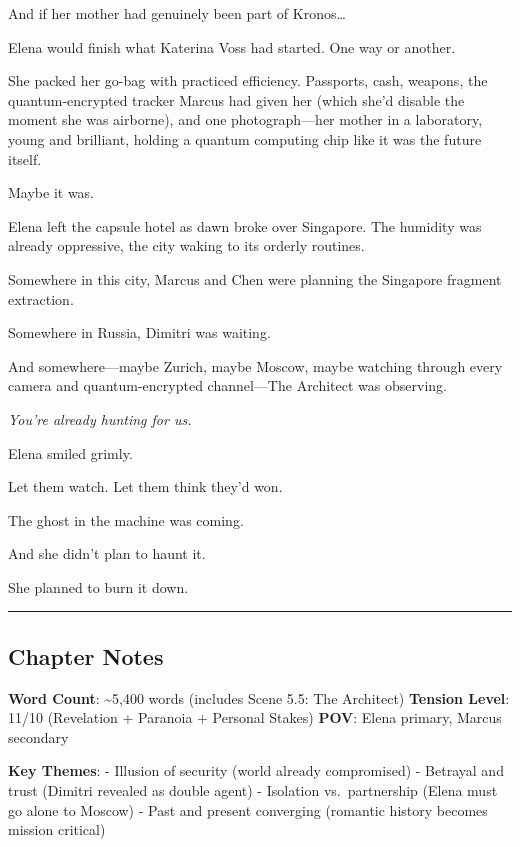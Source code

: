 And if her mother had genuinely been part of Kronos\ldots{}

Elena would finish what Katerina Voss had started. One way or another.

She packed her go-bag with practiced efficiency. Passports, cash, weapons, the quantum-encrypted tracker Marcus had given her (which she'd disable the moment she was airborne), and one photograph---her mother in a laboratory, young and brilliant, holding a quantum computing chip like it was the future itself.

Maybe it was.

Elena left the capsule hotel as dawn broke over Singapore. The humidity was already oppressive, the city waking to its orderly routines.

Somewhere in this city, Marcus and Chen were planning the Singapore fragment extraction.

Somewhere in Russia, Dimitri was waiting.

And somewhere---maybe Zurich, maybe Moscow, maybe watching through every camera and quantum-encrypted channel---The Architect was observing.

\emph{You're already hunting for us.}

Elena smiled grimly.

Let them watch. Let them think they'd won.

The ghost in the machine was coming.

And she didn't plan to haunt it.

She planned to burn it down.

\begin{center}\rule{0.5\linewidth}{0.5pt}\end{center}

\hypertarget{chapter-notes}{%
\subsection{Chapter Notes}\label{chapter-notes}}

\textbf{Word Count}: \textasciitilde5,400 words (includes Scene 5.5: The Architect) \textbf{Tension Level}: 11/10 (Revelation + Paranoia + Personal Stakes) \textbf{POV}: Elena primary, Marcus secondary

\textbf{Key Themes}: - Illusion of security (world already compromised) - Betrayal and trust (Dimitri revealed as double agent) - Isolation vs.~partnership (Elena must go alone to Moscow) - Past and present converging (romantic history becomes mission critical)

